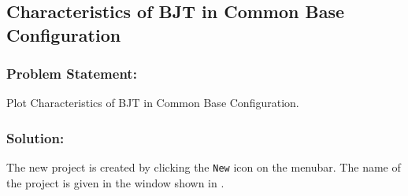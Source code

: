 \pagebreak

\subsection{Characteristics of BJT in Common Base Configuration}

\subsubsection{Problem Statement:} Plot Characteristics of BJT in Common Base Configuration.

\subsubsection{Solution:}
The new project is created by clicking the {\tt New} icon on the menubar. The name of the project is given in the window shown in .

